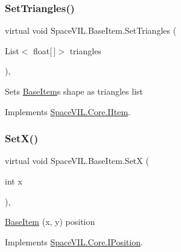 \subsubsection{\texorpdfstring{Set\+Triangles()}{SetTriangles()}}
{\footnotesize\ttfamily virtual void Space\+V\+I\+L.\+Base\+Item.\+Set\+Triangles (\begin{DoxyParamCaption}\item[{List$<$ float\mbox{[}$\,$\mbox{]}$>$}]{triangles }\end{DoxyParamCaption})\hspace{0.3cm}{\ttfamily [inline]}, {\ttfamily [virtual]}}



Sets \mbox{\hyperlink{class_space_v_i_l_1_1_base_item}{Base\+Item}}\textquotesingle{}s shape as triangles list 



Implements \mbox{\hyperlink{interface_space_v_i_l_1_1_core_1_1_i_item}{Space\+V\+I\+L.\+Core.\+I\+Item}}.

\mbox{\label{class_space_v_i_l_1_1_base_item_a6ad3ba5bf9637b193d78b22ee2867434}} 
\subsubsection{\texorpdfstring{Set\+X()}{SetX()}}
{\footnotesize\ttfamily virtual void Space\+V\+I\+L.\+Base\+Item.\+SetX (\begin{DoxyParamCaption}\item[{int}]{x }\end{DoxyParamCaption})\hspace{0.3cm}{\ttfamily [inline]}, {\ttfamily [virtual]}}



\mbox{\hyperlink{class_space_v_i_l_1_1_base_item}{Base\+Item}} (x, y) position 



Implements \mbox{\hyperlink{interface_space_v_i_l_1_1_core_1_1_i_position}{Space\+V\+I\+L.\+Core.\+I\+Position}}.

\mbox{\label{class_space_v_i_l_1_1_base_item_aec3ac6bb0e7d814b478d89b93f8e3d18}} 
